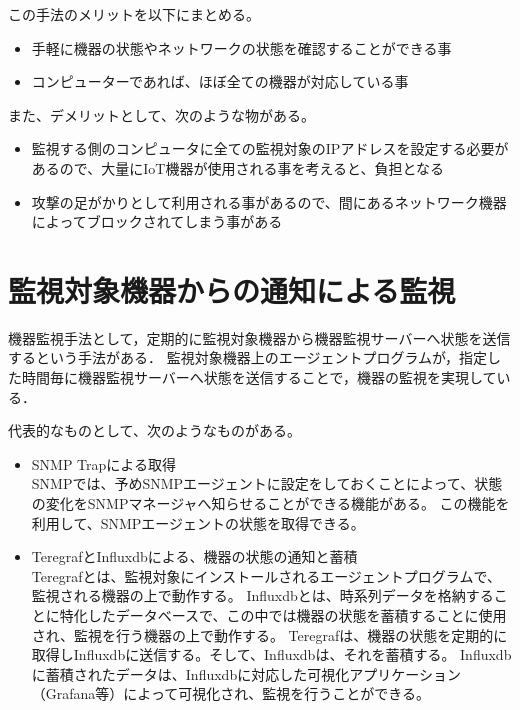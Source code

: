 	この手法のメリットを以下にまとめる。
	\begin{itemize}
		\item 手軽に機器の状態やネットワークの状態を確認することができる事
		\item コンピューターであれば、ほぼ全ての機器が対応している事
	\end{itemize}

	また、デメリットとして、次のような物がある。
	\begin{itemize}
		\item 監視する側のコンピュータに全ての監視対象のIPアドレスを設定する必要があるので、大量にIoT機器が使用される事を考えると、負担となる
		\item 攻撃の足がかりとして利用される事があるので、間にあるネットワーク機器によってブロックされてしまう事がある
	\end{itemize}

\section{監視対象機器からの通知による監視}
	機器監視手法として，定期的に監視対象機器から機器監視サーバーへ状態を送信するという手法がある．
	監視対象機器上のエージェントプログラムが，指定した時間毎に機器監視サーバーへ状態を送信することで，機器の監視を実現している．
	\medskip
	
	代表的なものとして、次のようなものがある。
	\begin{itemize}
		\item SNMP Trapによる取得\\
			SNMPでは、予めSNMPエージェントに設定をしておくことによって、状態の変化をSNMPマネージャへ知らせることができる機能がある。
			この機能を利用して、SNMPエージェントの状態を取得できる。
		\item TeregrafとInfluxdbによる、機器の状態の通知と蓄積\\
					Teregrafとは、監視対象にインストールされるエージェントプログラムで、監視される機器の上で動作する。
					Influxdbとは、時系列データを格納することに特化したデータベースで、この中では機器の状態を蓄積することに使用され、監視を行う機器の上で動作する。
					Teregrafは、機器の状態を定期的に取得しInfluxdbに送信する。そして、Influxdbは、それを蓄積する。
					Influxdbに蓄積されたデータは、Influxdbに対応した可視化アプリケーション（Grafana等）によって可視化され、監視を行うことができる。
\begin{comment}
				\item Logstashによるログの転送による機器の監視\\
					Logstashとは、アプリケーションのログやシステムのログを転送するためのプログラムであり、監視される機器上で動作する。
					Logstashは、ログファイルの監視をしており、ログファイルに追記があった場合、追記分のデータをデータベースに送信することができる。
					データベースとしては、Elasticsearchが良く用いられる。
					データベースに蓄積されたデータは、対応した可視化アプリケーションによって可視化を行うことで、監視をする。
\end{itemize}
\end{comment}
	\end{itemize}
	
